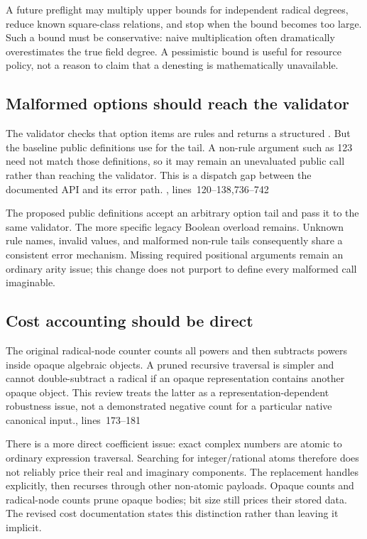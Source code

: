 \documentclass[11pt,a4paper]{article}
\newcommand{\code}[1]{\texttt{\detokenize{#1}}}
\newcommand{\src}[1]{\cite{source}, lines~#1}
\theoremstyle{definition}\newtheorem{definition}[proposition]{Definition}
\theoremstyle{remark}\newtheorem{remark}[proposition]{Remark}
\begin{document}
A future preflight may multiply upper bounds for independent radical degrees,
reduce known square-class relations, and stop when the bound becomes too large.
Such a bound must be conservative: naive multiplication often dramatically
overestimates the true field degree. A pessimistic bound is useful for resource
policy, not a reason to claim that a denesting is mathematically unavailable.

\subsection{Malformed options should reach the validator}
The validator checks that option items are rules and returns a structured
\code{Failure}. But the baseline public definitions use \code{OptionsPattern[]}
for the tail. A non-rule argument such as 123 need not match those definitions,
so it may remain an unevaluated public call rather than reaching the validator.
This is a dispatch gap between the documented API and its error path.
\src{120--138,736--742}

The proposed public definitions accept an arbitrary option tail and pass it to
the same validator. The more specific legacy Boolean overload remains. Unknown
rule names, invalid values, and malformed non-rule tails consequently share a
consistent error mechanism. Missing required positional arguments remain an
ordinary arity issue; this change does not purport to define every malformed
call imaginable.

\subsection{Cost accounting should be direct}
The original radical-node counter counts all powers and then subtracts powers
inside opaque algebraic objects. A pruned recursive traversal is simpler and
cannot double-subtract a radical if an opaque representation contains another
opaque object. This review treats the latter as a representation-dependent
robustness issue, not a demonstrated negative count for a particular native
canonical input.\src{173--181}

There is a more direct coefficient issue: exact complex numbers are atomic to
ordinary expression traversal. Searching for integer/rational atoms therefore
does not reliably price their real and imaginary components. The replacement
\code{bitSize} handles \code{Complex} explicitly, then recurses through other
non-atomic payloads. Opaque counts and radical-node counts prune opaque bodies;
bit size still prices their stored data. The revised cost documentation states
this distinction rather than leaving it implicit.
\end{document}
